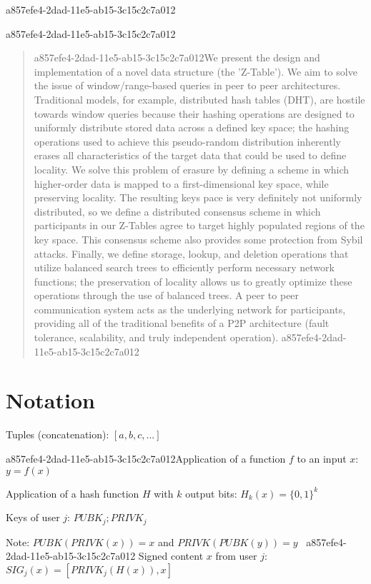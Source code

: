 \documentclass[12pt]{article}
\begin{document}
a857efe4-2dad-11e5-ab15-3c15c2c7a012
\maketitle
a857efe4-2dad-11e5-ab15-3c15c2c7a012
\begin{abstract}
a857efe4-2dad-11e5-ab15-3c15c2c7a012We present the design and implementation of a novel data structure (the 'Z-Table'). We aim to solve the issue of window/range-based queries in peer to peer architectures. Traditional models, for example,  distributed hash tables (DHT), are hostile towards window queries because their hashing operations are designed to uniformly distribute stored data across a defined key space; the hashing operations used to achieve this pseudo-random distribution inherently erases all characteristics of the target data that could be used to define locality. We solve this problem of erasure by defining a scheme in which higher-order data is mapped to a first-dimensional key space, while preserving locality. The resulting keys pace is very definitely not uniformly distributed, so we define a distributed consensus scheme in which participants in our Z-Tables agree to target highly populated regions of the key space. This consensus scheme also provides some protection from Sybil attacks. Finally, we define storage, lookup, and deletion operations that utilize balanced search trees to efficiently perform necessary network functions; the preservation of locality allows us to greatly optimize these operations through the use of balanced trees. A peer to peer communication system acts as the underlying network for participants, providing all of the traditional benefits of a P2P architecture (fault tolerance, scalability, and truly independent operation).
a857efe4-2dad-11e5-ab15-3c15c2c7a012\end{abstract}

\section{Notation}

Tuples (concatenation): $[a,b,c,...]$

a857efe4-2dad-11e5-ab15-3c15c2c7a012Application of a function $f$ to an input $x$: $y=f(x)$

Application of a hash function $H$ with $k$ output bits: $H_{k}(x) = \{0,1\}^k$

Keys of user $j$: $ PUBK_j; PRIVK_j $

Note: $PUBK(PRIVK(x)) = x$ and $PRIVK(PUBK(y)) = y$~
a857efe4-2dad-11e5-ab15-3c15c2c7a012
Signed content $x$ from user $j$: $SIG_j(x) = \left[ PRIVK_j( H(x) ), x \right]$
\end{document}
